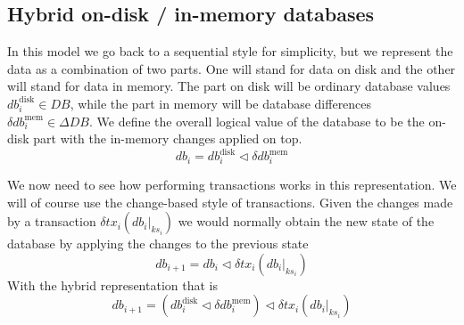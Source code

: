 \documentclass[11pt,a4paper]{article}
\newcommand\restrict[2]{\left.#1\right|_{#2}}
\begin{document}
\subsection{Hybrid on-disk / in-memory databases}

In this model we go back to a sequential style for simplicity, but we represent
the data as a combination of two parts. One will stand for data on disk and the
other will stand for data in memory. The part on disk will be ordinary database
values $\mathit{db}^{\mathrm{disk}}_i \in \mathit{DB}$, while the part in
memory will be database differences
$\delta\mathit{db}^{\mathrm{mem}}_i \in \Delta\mathit{DB}$. We
define the  overall logical value of the database to be the on-disk part with
the in-memory changes applied on top.
\[
\mathit{db}_i = \mathit{db}^{\mathrm{disk}}_i \triangleleft \delta\mathit{db}^{\mathrm{mem}}_i
\]
\begin{center}
\end{center}
We now need to see how performing transactions works in this representation. We
will of course use the change-based style of transactions. Given the changes
made by a transaction $\delta\mathit{tx}_i(\restrict{\mathit{db}_i}{\mathit{ks}_i})$
we would normally obtain the new state of the database by applying the changes
to the previous state
\[
\mathit{db}_{i+1} = \mathit{db}_i \triangleleft \delta\mathit{tx}_i(\restrict{\mathit{db}_i}{\mathit{ks}_i})
\]
With the hybrid representation that is
\[
\mathit{db}_{i+1} = \left( \mathit{db}^{\mathrm{disk}}_i \triangleleft \delta\mathit{db}^{\mathrm{mem}}_i \right)
      \triangleleft \delta\mathit{tx}_i(\restrict{\mathit{db}_i}{\mathit{ks}_i})
\]
\end{document}
